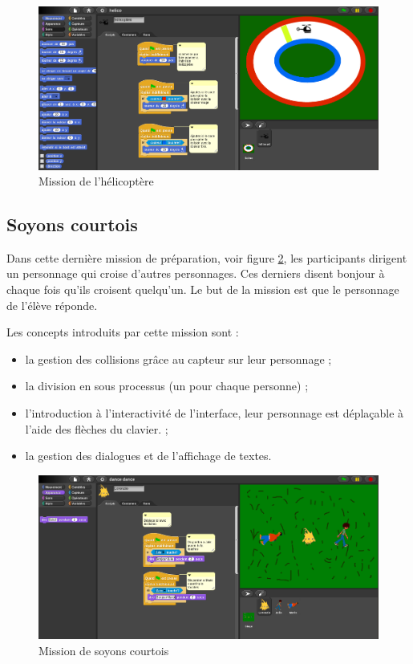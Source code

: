 \begin{figure}
  \begin{center}
    \includegraphics[width=\textwidth]{content/7-solution/1-missions/images/helicoptere}
    \caption{Mission de l'hélicoptère}
    \label{fig:mission-hélicoptère}
  \end{center}
\end{figure}

\subsection{Soyons courtois}
\label{mission-courtois}
Dans cette dernière mission de préparation, voir figure \ref{fig:courtois}, les participants dirigent un personnage qui croise d'autres personnages. Ces derniers disent bonjour à chaque fois qu'ils croisent quelqu'un. Le but de la mission est que le personnage de l'élève réponde.

Les concepts introduits par cette mission sont :
\begin{itemize}
\item la gestion des collisions grâce au capteur sur leur personnage ;
\item la division en sous processus (un pour chaque personne) ;
\item l'introduction à l'interactivité de l'interface, leur personnage est déplaçable à l'aide des flèches du clavier. ;
\item la gestion des dialogues et de l'affichage de textes.
\end{itemize}

\begin{figure}
  \begin{center}
    \includegraphics[width=\textwidth]{content/7-solution/1-missions/images/courtois}
    \caption{Mission de soyons courtois}
    \label{fig:courtois}
  \end{center}
\end{figure}

